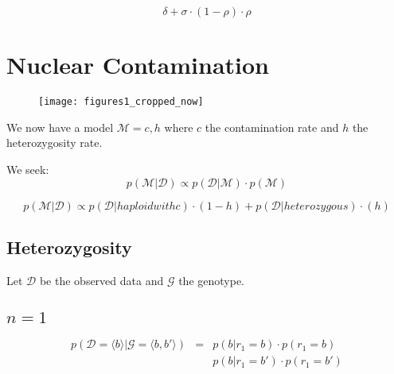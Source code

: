 \documentclass[a4paper,12pt]{article}
\begin{document}
\begin{equation}
\delta + \sigma \cdot (1- \rho ) \cdot \rho
\end{equation}



\section{Nuclear Contamination}

\begin{figure}
  \begin{center}
    \texttt{[image: figures1\_cropped\_now]}  
  \end{center}
  \caption{}\label{fig1}
\end{figure}



We now have a model $\mathcal{M}={c,h}$ where  $c$ the contamination rate and $h$ the heterozygosity rate. 

We seek:
\begin{equation}
p(\mathcal{M} | \mathcal{D}   ) \propto  p(\mathcal{D}  | \mathcal{M} ) \cdot p(\mathcal{M} )
\end{equation}



\begin{equation}
p(\mathcal{M} | \mathcal{D}   ) \propto  p(\mathcal{D}  | haploid with c ) \cdot (1-h) + p(\mathcal{D}  | heterozygous ) \cdot (h)
\end{equation}




\subsection{Heterozygosity}

Let $\mathcal{D}$ be the observed data and $\mathcal{G}$ the genotype. 

\subsection{$n=1$}

\begin{eqnarray*}
p(\mathcal{D} = \langle b \rangle | \mathcal{G} = \langle b,b' \rangle) & = & p( b | r_1 = b   )   \cdot p( r_1 =  b) \\
                                                                        &   & p( b | r_1 = b'   )   \cdot p( r_1 =  b')  \\
\end{eqnarray*}
\end{document}
